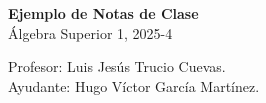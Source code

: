 \documentclass[letterpaper,DIV=12,headsepline,12pt]{scrartcl}
\begin{document}
    \thispagestyle{beginstyle}
    \begin{center}
        {\fontsize{30}{60}\rmfamily \textbf{Ejemplo de Notas de Clase}} \\ \vspace{.2cm}
        Álgebra Superior 1, 2025-4
    \end{center}
    \begin{flushright}
        \footnotesize \hfill Profesor: Luis Jesús Trucio Cuevas.\\
        \hfill Ayudante: Hugo Víctor García Martínez.
    \end{flushright}

    \lipsum[1-10]
\end{document}

